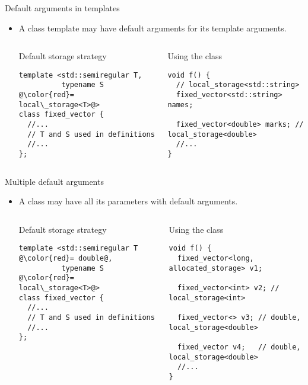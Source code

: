 \begin{frame}[t,fragile]{Default arguments in templates}
\begin{itemize}
  \item A class template may have default arguments for its template arguments.

\begin{columns}[T]

\begin{block}{Default storage strategy}
\begin{lstlisting}[escapechar=@]
template <std::semiregular T, 
          typename S @\color{red}= local\_storage<T>@>
class fixed_vector {
  //...
  // T and S used in definitions
  //...
};
\end{lstlisting}
\end{block}

\pause
{}
\begin{block}{Using the class}
\begin{lstlisting}
void f() {
  // local_storage<std::string>
  fixed_vector<std::string> names;

  fixed_vector<double> marks; // local_storage<double>
  //...
}
\end{lstlisting}
\end{block}

\end{columns}

\end{itemize}
\end{frame}

\begin{frame}[t,fragile]{Multiple default arguments}
\begin{itemize}
  \item A class may have all its parameters with default arguments.

\begin{columns}[T]

\begin{block}{Default storage strategy}
\begin{lstlisting}[escapechar=@]
template <std::semiregular T @\color{red}= double@, 
          typename S @\color{red}= local\_storage<T>@>
class fixed_vector {
  //...
  // T and S used in definitions
  //...
};
\end{lstlisting}
\end{block}

\pause
{}
\begin{block}{Using the class}
\begin{lstlisting}
void f() {
  fixed_vector<long, allocated_storage> v1;

  fixed_vector<int> v2; // local_storage<int>

  fixed_vector<> v3; // double, local_storage<double>

  fixed_vector v4;   // double, local_storage<double>
  //...
}
\end{lstlisting}
\end{block}

\end{columns}

\end{itemize}
\end{frame}
